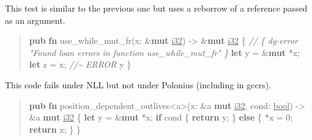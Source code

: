 \documentclass[
  11pt,
  twoside]{report}
\newenvironment{Shaded}{}{}
\newcommand{\CommentTok}[1]{\textit{#1}}
\newcommand{\ControlFlowTok}[1]{\textbf{#1}}
\newcommand{\DataTypeTok}[1]{\underline{#1}}
\newcommand{\DecValTok}[1]{#1}
\newcommand{\KeywordTok}[1]{\textbf{#1}}
\newcommand{\NormalTok}[1]{#1}
\newcommand{\OperatorTok}[1]{#1}
\newcommand{\OtherTok}[1]{#1}
\begin{document}
This test is similar to the previous one but uses a reborrow of a
reference passed as an argument.

\begin{quote}
\begin{Shaded}
\begin{Highlighting}[]
\KeywordTok{pub} \KeywordTok{fn}\NormalTok{ use\_while\_mut\_fr(x}\OperatorTok{:} \OperatorTok{\&}\KeywordTok{mut} \DataTypeTok{i32}\NormalTok{) }\OperatorTok{{-}\textgreater{}} \OperatorTok{\&}\KeywordTok{mut} \DataTypeTok{i32} \OperatorTok{\{} 
    \CommentTok{// \{ dg{-}error "Found loan errors in function use\_while\_mut\_fr" \}}
    \KeywordTok{let}\NormalTok{ y }\OperatorTok{=} \OperatorTok{\&}\KeywordTok{mut} \OperatorTok{*}\NormalTok{x}\OperatorTok{;}
    \KeywordTok{let}\NormalTok{ z }\OperatorTok{=}\NormalTok{ x}\OperatorTok{;} \CommentTok{//\textasciitilde{} ERROR}
\NormalTok{    y}
\OperatorTok{\}}
\end{Highlighting}
\end{Shaded}
\end{quote}

\clearpage

This code fails under NLL but not under Polonius (including in gccrs).

\begin{quote}
\begin{Shaded}
\begin{Highlighting}[]
\KeywordTok{pub} \KeywordTok{fn}\NormalTok{ position\_dependent\_outlives}\OperatorTok{\textless{}}\OtherTok{\textquotesingle{}a}\OperatorTok{\textgreater{}}\NormalTok{(x}\OperatorTok{:} \OperatorTok{\&}\OtherTok{\textquotesingle{}a} \KeywordTok{mut} \DataTypeTok{i32}\OperatorTok{,}\NormalTok{ cond}\OperatorTok{:} \DataTypeTok{bool}\NormalTok{)}
    \OperatorTok{{-}\textgreater{}} \OperatorTok{\&}\OtherTok{\textquotesingle{}a} \KeywordTok{mut} \DataTypeTok{i32} \OperatorTok{\{}
    \KeywordTok{let}\NormalTok{ y }\OperatorTok{=} \OperatorTok{\&}\KeywordTok{mut} \OperatorTok{*}\NormalTok{x}\OperatorTok{;}
    \ControlFlowTok{if}\NormalTok{ cond }\OperatorTok{\{}
        \ControlFlowTok{return}\NormalTok{ y}\OperatorTok{;}
    \OperatorTok{\}} \ControlFlowTok{else} \OperatorTok{\{}
        \OperatorTok{*}\NormalTok{x }\OperatorTok{=} \DecValTok{0}\OperatorTok{;}
        \ControlFlowTok{return}\NormalTok{ x}\OperatorTok{;}
    \OperatorTok{\}}
\OperatorTok{\}}
\end{Highlighting}
\end{Shaded}
\end{quote}
\end{document}
